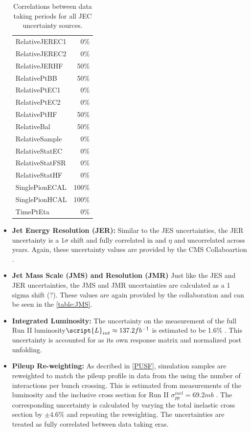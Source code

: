 \begin{itemize}
\begin{table}[h!]
\begin{tabular}{lr}
      RelativeJEREC1 & 0\% \\
      RelativeJEREC2 & 0\% \\
      RelativeJERHF & 50\% \\
      RelativePtBB & 50\% \\
      RelativePtEC1 & 0\% \\
      RelativePtEC2 & 0\% \\
      RelativePtHF & 50\% \\
      RelativeBal & 50\% \\
      RelativeSample & 0\% \\
      RelativeStatEC & 0\% \\
      RelativeStatFSR & 0\% \\
      RelativeStatHF & 0\% \\
      SinglePionECAL & 100\% \\
      SinglePionHCAL & 100\% \\
      TimePtEta & 0\% \\ \hline
    \end{tabular}
    \caption{Correlations between data taking periods for all JEC uncertainty sources.}
    \label{table:tab2}
  \end{table}
\item \textbf{Jet Energy Resolution (JER):} Similar to the JES uncertainties, the JER uncertainty is a $1\sigma$ shift and fully correlated in  \pt and $\eta$ and uncorrelated across years. Again, these uncertainty values are provided by the CMS Collaboartion \cite{JEC}.
\item \textbf{Jet Mass Scale (JMS) and Resolution (JMR)} Just like the JES and JER uncertainties, the JMS and JMR uncertainties are calculated as a 1 sigma shift (?). These values are again provided by the collaboration and can be seen in the \ref{table:JMS}.
\item \textbf{Integrated Luminosity:}
 The uncertainty on the measurement of the full Run II luminosity$\script{L}_{int}\approx 137.2 fb^{-1}$ is estimated to be 1.6\% \cite{lumi2016, lumi2017, lumi2018}. This uncertainty is accounted for as its own response matrix and normalized post unfolding.
\item \textbf{Pileup Re-weighting:}
 As decribed in \ref{PUSF}, simulation samples are reweighted to match the pileup profile in data from the using the number of interactions per bunch crossing. This is estimated from measurements of the luminosity and the inclusive cross section for Run II $\sigma^{inel}_{pp} = 69.2 mb$ \cite{LUMIPOGtwiki}. The corresponding uncertainty is calculated by varying the total inelastic cross section by $\pm 4.6\%$ and repeating the reweighting. The uncertainties are treated as fully correlated between data taking eras.

\end{itemize}

